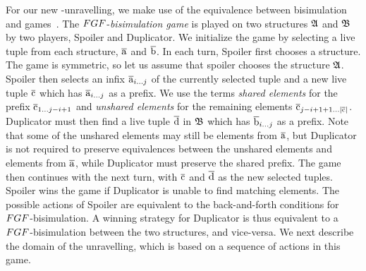 For our new \FGF-unravelling, we make use of the equivalence between bisimulation and games~\cite[Sec. 1.2.1]{Gradel014}.
The $\FGF$-\emph{bisimulation game} is played on two structures ${\mathfrak{A}}$ and ${\mathfrak{B}}$ by two players, Spoiler and Duplicator.
We initialize the game by selecting a live tuple from each structure, $\overline{\mathrm{a}}$ and $\overline{\mathrm{b}}$.
In each turn, Spoiler first chooses a structure.
The game is symmetric, so let us assume that spoiler chooses the structure ${\mathfrak{A}}$.
Spoiler then selects an infix $\overline{\mathrm{a}}_{i\ldots j}$ of the currently selected tuple and a new live tuple $\overline{\mathrm{c}}$ which has $\overline{\mathrm{a}}_{i\ldots j}$ as a prefix.
We use the terms \emph{shared elements} for the prefix $\overline{\mathrm{c}}_{1\ldots j-i+1}$ and \emph{unshared elements} for the remaining elements $\overline{\mathrm{c}}_{j-i+1+1\ldots|\overline{\mathrm{c}}|}$.
Duplicator must then find a live tuple $\overline{\mathrm{d}}$ in ${\mathfrak{B}}$ which has $\overline{\mathrm{b}}_{i\ldots j}$ as a prefix.
Note that some of the unshared elements may still be elements from $\overline{\mathrm{a}}$, but Duplicator is not required to preserve equivalences between the unshared elements and elements from $\overline{\mathrm{a}}$, while Duplicator must preserve the shared prefix.
The game then continues with the next turn, with $\overline{\mathrm{c}}$ and $\overline{\mathrm{d}}$ as the new selected tuples.
Spoiler wins the game if Duplicator is unable to find matching elements.
The possible actions of Spoiler are equivalent to the back-and-forth conditions for $\FGF$-bisimulation.
A winning strategy for Duplicator is thus equivalent to a $\FGF$-bisimulation between the two structures, and vice-versa.
We next describe the domain of the unravelling, which is based on a sequence of actions in this game.



